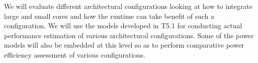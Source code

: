 We will evaluate different architectural configurations looking at how to integrate large and small cores and
how the runtime can take benefit of such a configuration. We will use the models developed in T5.1 for
conducting actual performance estimation of various architectural configurations. Some of the power models
will also be embedded at this level so as to perform comparative power efficiency assessment of various
configurations.
\fi

